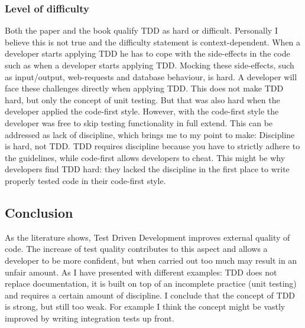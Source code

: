 \subsubsection*{Level of difficulty}

Both the paper and the book qualify TDD as hard or difficult.
Personally I believe this is not true and the difficulty statement is context-dependent.
When a developer starts applying TDD he has to cope with the side-effects in the code such as when a developer starts applying TDD.
Mocking these side-effects, such as input/output, web-requests and database behaviour, is hard.
A developer will face these challenges directly when applying TDD.
This does not make TDD hard, but only the concept of unit testing.
But that was also hard when the developer applied the code-first style.
However, with the code-first style the developer was free to skip testing functionality in full extend.
This can be addressed as lack of discipline, which brings me to my point to make: Discipline is hard, not TDD.
TDD requires discipline because you have to strictly adhere to the guidelines, while code-first allows developers to cheat.
This might be why developers find TDD hard: they lacked the discipline in the first place to write properly tested code in their code-first style.

\subsection*{Conclusion}

As the literature shows, Test Driven Development improves external quality of code.
The increase of test quality contributes to this aspect and allows a developer to be more confident, but when carried out too much may result in an unfair amount.
As I have presented with different examples:
TDD does not replace documentation, it is built on top of an incomplete practice (unit testing) and requires a certain amount of discipline.
I conclude that the concept of TDD is strong, but still too weak.
For example I think the concept might be vastly improved by writing integration tests up front.
